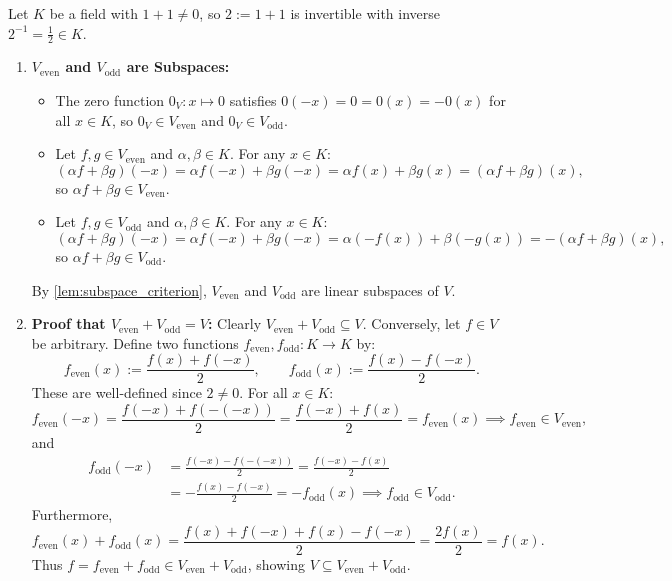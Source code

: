 \begin{exercisesolution}
\label{sol:even_odd_function_subspaces}
Let $K$ be a field with $1 + 1 \ne 0$, so $2 := 1 + 1$ is invertible with inverse $2^{-1} = \frac{1}{2} \in K$.

\begin{enumerate}[label=\textbf{(\alph*)}]
    \item \textbf{$V_{\mathrm{even}}$ and $V_{\mathrm{odd}}$ are Subspaces:}
    \begin{itemize}
        \item The zero function $0_V \colon x \mapsto 0$ satisfies $0(-x) = 0 = 0(x) = -0(x)$ for all $x \in K$, so $0_V \in V_{\mathrm{even}}$ and $0_V \in V_{\mathrm{odd}}$.
        \item Let $f, g \in V_{\mathrm{even}}$ and $\alpha, \beta \in K$. For any $x \in K$:
        \[
        (\alpha f + \beta g)(-x) = \alpha f(-x) + \beta g(-x) = \alpha f(x) + \beta g(x) = (\alpha f + \beta g)(x),
        \]
        so $\alpha f + \beta g \in V_{\mathrm{even}}$.
        \item Let $f, g \in V_{\mathrm{odd}}$ and $\alpha, \beta \in K$. For any $x \in K$:
        \[
        (\alpha f + \beta g)(-x) = \alpha f(-x) + \beta g(-x) = \alpha (-f(x)) + \beta (-g(x)) = -(\alpha f + \beta g)(x),
        \]
        so $\alpha f + \beta g \in V_{\mathrm{odd}}$.
    \end{itemize}
    By \cref{lem:subspace_criterion}, $V_{\mathrm{even}}$ and $V_{\mathrm{odd}}$ are linear subspaces of $V$.

    \item \textbf{Proof that $V_{\mathrm{even}} + V_{\mathrm{odd}} = V$:}
    Clearly $V_{\mathrm{even}} + V_{\mathrm{odd}} \subseteq V$. Conversely, let $f \in V$ be arbitrary. Define two functions $f_{\mathrm{even}}, f_{\mathrm{odd}} \colon K \to K$ by:
    \[
    f_{\mathrm{even}}(x) := \frac{f(x) + f(-x)}{2}, \qquad f_{\mathrm{odd}}(x) := \frac{f(x) - f(-x)}{2}.
    \]
    These are well-defined since $2 \ne 0$. For all $x \in K$:
    \[
    f_{\mathrm{even}}(-x) = \frac{f(-x) + f(-(-x))}{2} = \frac{f(-x) + f(x)}{2} = f_{\mathrm{even}}(x) \implies f_{\mathrm{even}} \in V_{\mathrm{even}},
    \]
    and
    \begin{align*}
    f_{\mathrm{odd}}(-x) &= \frac{f(-x) - f(-(-x))}{2} = \frac{f(-x) - f(x)}{2} \\
    &= -\frac{f(x) - f(-x)}{2} = -f_{\mathrm{odd}}(x) \implies f_{\mathrm{odd}} \in V_{\mathrm{odd}}.
    \end{align*}
    Furthermore,
    \[
    f_{\mathrm{even}}(x) + f_{\mathrm{odd}}(x) = \frac{f(x) + f(-x) + f(x) - f(-x)}{2} = \frac{2f(x)}{2} = f(x).
    \]
    Thus $f = f_{\mathrm{even}} + f_{\mathrm{odd}} \in V_{\mathrm{even}} + V_{\mathrm{odd}}$, showing $V \subseteq V_{\mathrm{even}} + V_{\mathrm{odd}}$.


\end{enumerate}
\end{exercisesolution}
